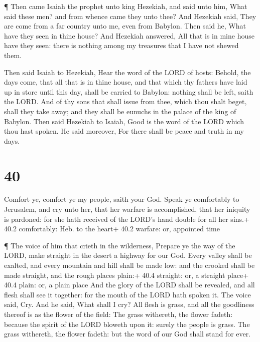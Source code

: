  ¶ Then came Isaiah the prophet unto king Hezekiah, and said
unto him, What said these men? and from whence came they unto thee? And
Hezekiah said, They are come from a far country unto me, even from
Babylon.  Then said he, What have they seen in thine house?
And Hezekiah answered, All that is in mine house have they seen: there
is nothing among my treasures that I have not shewed them.

 Then said Isaiah to Hezekiah, Hear the word of the LORD of
hosts:  Behold, the days come, that all that is in thine
house, and that which thy fathers have laid up in store until this day,
shall be carried to Babylon: nothing shall be left, saith the LORD.
 And of thy sons that shall issue from thee, which thou
shalt beget, shall they take away; and they shall be eunuchs in the
palace of the king of Babylon.  Then said Hezekiah to
Isaiah, Good is the word of the LORD which thou hast spoken. He said
moreover, For there shall be peace and truth in my days.

\hypertarget{section-39}{%
\section{40}\label{section-39}}

 Comfort ye, comfort ye my people, saith your God.
 Speak ye comfortably to Jerusalem, and cry unto her, that
her warfare is accomplished, that her iniquity is pardoned: for she hath
received of the LORD's hand double for all her sins.+ 40.2 comfortably:
Heb. to the heart+ 40.2 warfare: or, appointed time

 ¶ The voice of him that crieth in the wilderness, Prepare
ye the way of the LORD, make straight in the desert a highway for our
God.  Every valley shall be exalted, and every mountain and
hill shall be made low: and the crooked shall be made straight, and the
rough places plain:+ 40.4 straight: or, a straight place+ 40.4 plain:
or, a plain place  And the glory of the LORD shall be
revealed, and all flesh shall see it together: for the mouth of the LORD
hath spoken it.  The voice said, Cry. And he said, What
shall I cry? All flesh is grass, and all the goodliness thereof is as
the flower of the field:  The grass withereth, the flower
fadeth: because the spirit of the LORD bloweth upon it: surely the
people is grass.  The grass withereth, the flower fadeth:
but the word of our God shall stand for ever.

